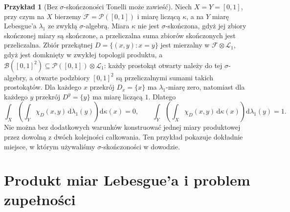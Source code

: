\documentclass[11pt,a4paper,oneside]{book}
\numberwithin{equation}{chapter}
\theoremstyle{plain}
\theoremstyle{definition}
\newtheorem{przyklad}[twierdzenie]{Przykład}
\theoremstyle{remark}
\begin{document}
\begin{przyklad}[Bez $\sigma$-skończoności Tonelli może zawieść]
\label{ex:non-sigma-tonelli-12}
Niech $X=Y=[0,1]$, przy czym na $X$ bierzemy
$\mathcal F=\mathcal P([0,1])$ i miarę liczącą $\kappa$,
a na $Y$ miarę Lebesgue'a $\lambda_1$ ze zwykłą
$\sigma$-algebrą. Miara $\kappa$ nie jest
$\sigma$-skończona, gdyż jej zbiory skończonej
miary są skończone, a przeliczalna suma zbiorów
skończonych jest przeliczalna.
Zbiór przekątnej $D=\{(x,y):x=y\}$ jest
mierzalny w $\mathcal F\otimes\mathcal L_1$,
gdyż jest domknięty w zwykłej topologii produktu,
a $\mathcal B([0,1]^2)\subseteq\mathcal P([0,1])\otimes\mathcal L_1$:
każdy prostokąt otwarty należy do tej $\sigma$-algebry,
a otwarte podzbiory $[0,1]^2$ są przeliczalnymi sumami
takich prostokątów.
Dla każdego $x$ przekrój $D_x=\{x\}$ ma
$\lambda_1$-miarę zero, natomiast dla każdego $y$
przekrój $D^y=\{y\}$ ma miarę liczącą $1$.
Dlatego
\[
\int_X\left(\int_Y\chi_D(x,y)\,
\mathrm d\lambda_1(y)\right)\mathrm d\kappa(x)=0,
\qquad
\int_Y\left(\int_X\chi_D(x,y)\,
\mathrm d\kappa(x)\right)\mathrm d\lambda_1(y)=1.
\]
Nie można bez dodatkowych warunków konstruować
jednej miary produktowej przez dowolną z dwóch
kolejności całkowania. Ten przykład pokazuje
dokładnie miejsce, w którym używaliśmy
$\sigma$-skończoności w dowodzie.
\end{przyklad}

\section{Produkt miar Lebesgue'a i problem zupełności}
\end{document}
